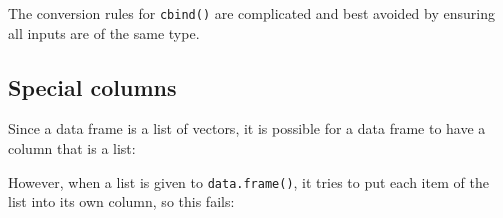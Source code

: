 \begin{Shaded}
\begin{Highlighting}[]
\StringTok{ }\NormalTok{(}\NormalTok{(} \NormalTok{:}\NormalTok{, } \NormalTok{(}\NormalTok{, }\NormalTok{)))}
\StringTok{ }\NormalTok{(} \NormalTok{:}\NormalTok{, } \NormalTok{(}\NormalTok{, }\NormalTok{),}
   \NormalTok{)}
\end{Highlighting}
\end{Shaded}

The conversion rules for \texttt{cbind()} are complicated and best
avoided by ensuring all inputs are of the same type.

\subsection{Special columns}\label{special-columns}

Since a data frame is a list of vectors, it is possible for a data frame
to have a column that is a list:

\begin{Shaded}
\begin{Highlighting}[]
\StringTok{ }\NormalTok{(} \NormalTok{:}\NormalTok{)}
\StringTok{ }\NormalTok{(}\NormalTok{:}\NormalTok{, }\NormalTok{:}\NormalTok{, }\NormalTok{:}\NormalTok{)}
\end{Highlighting}
\end{Shaded}

However, when a list is given to \texttt{data.frame()}, it tries to put
each item of the list into its own column, so this fails:

